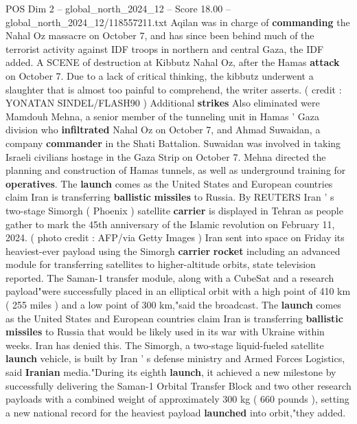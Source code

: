 \begin{textsample}{POS Dim 2 – global\_north\_2024\_12 – Score 18.00 – global\_north\_2024\_12/118557211.txt}  \label{ex:f2_pos_280}
Aqilan was in charge of \textbf{commanding} the Nahal Oz massacre on October 7, and has since been behind much of the terrorist activity against IDF troops in northern and central Gaza, the IDF added.
A SCENE of destruction at Kibbutz Nahal Oz, after the Hamas \textbf{attack} on October 7.
Due to a lack of critical thinking, the kibbutz underwent a slaughter that is almost too painful to comprehend, the writer asserts. ( credit : YONATAN SINDEL/FLASH90 ) Additional \textbf{strikes} Also eliminated were Mamdouh Mehna, a senior member of the tunneling unit in Hamas ' Gaza division who \textbf{infiltrated} Nahal Oz on October 7, and Ahmad Suwaidan, a company \textbf{commander} in the Shati Battalion.
Suwaidan was involved in taking Israeli civilians hostage in the Gaza Strip on October 7.
Mehna directed the planning and construction of Hamas tunnels, as well as underground training for \textbf{operatives}.
The \textbf{launch} comes as the United States and European countries claim Iran is transferring \textbf{ballistic} \textbf{missiles} to Russia.
By REUTERS Iran ' s two-stage Simorgh ( Phoenix ) satellite \textbf{carrier} is displayed in Tehran as people gather to mark the 45th anniversary of the Islamic revolution on February 11, 2024. ( photo credit : AFP/via Getty Images ) Iran sent into space on Friday its heaviest-ever payload using the Simorgh \textbf{carrier} \textbf{rocket} including an advanced module for transferring satellites to higher-altitude orbits, state television reported.
The Saman-1 transfer module, along with a CubeSat and a research payload"were successfully placed in an elliptical orbit with a high point of 410 km ( 255 miles ) and a low point of 300 km,"said the broadcast.
The \textbf{launch} comes as the United States and European countries claim Iran is transferring \textbf{ballistic} \textbf{missiles} to Russia that would be likely used in its war with Ukraine within weeks.
Iran has denied this.
The Simorgh, a two-stage liquid-fueled satellite \textbf{launch} vehicle, is built by Iran ' s defense ministry and Armed Forces Logistics, said \textbf{Iranian} media."During its eighth \textbf{launch}, it achieved a new milestone by successfully delivering the Saman-1 Orbital Transfer Block and two other research payloads with a combined weight of approximately 300 kg ( 660 pounds ), setting a new national record for the heaviest payload \textbf{launched} into orbit,"they added.

\end{textsample}
